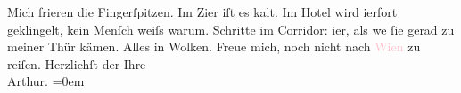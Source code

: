           \pstart
           Mich frieren die Fingerſpitzen. Im Zi{\geminationm}er iſt es
                    kalt. Im Hotel wird i{\geminationm}erfort geklingelt, kein
                    Menſch weiſs warum. Schritte im Corridor: i{\geminationm}er, als
                        we{\geminationn}{ }ſie gerad zu meiner Thür kämen. Alles in
                    Wolken. {\pb}Freue mich, noch nicht nach \textcolor{pink}{Wien}{}\ledrightnote{\textcolor{pink}{Wien}} zu reiſen.\pend
           \pstart
           Herzlichſt der Ihre{\\[\baselineskip]}\spacefill\mbox{Arthur.}\pend
           \leftskip=0em{}\endnumbering{}  
      